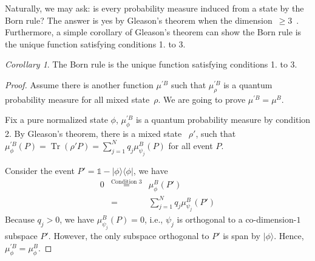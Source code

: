 \documentclass{article}
\theoremstyle{remark}
\newtheorem{cor}{Corollary}
\newcommand{\Hilb}{\mathcal{H}}
\newcommand{\ket}[1]{|#1\rangle}
\newcommand{\proj}[1]{|#1 \rangle\langle #1 |}
\newcommand{\Tr}{\mathop{\mathrm{Tr}}\nolimits}
\begin{document}
Naturally, we may ask: is every probability measure induced from a
state by the Born rule? The answer is yes by Gleason's theorem when
the dimension~$\ge3$~\cite{gleason1957,peres1995quantum,Redhead1987-REDINA}.
Furthermore, a simple corollary of Gleason's theorem can show the
Born rule is the unique function satisfying conditions 1. to 3.
\begin{cor}
The Born rule is the unique function satisfying conditions 1. to 3.
\end{cor}
\begin{proof}
Assume there is another function $\mu^{\prime B}$ such that $\mu^{\prime B}_{\rho}$
is a quantum probability measure for all mixed state~$\rho$. We
are going to prove $\mu^{\prime B}=\mu^B$.

Fix a pure normalized state $\phi$, $\mu^{\prime B}_{\phi}$ is a quantum
probability measure by condition 2. By Gleason's theorem, there is
a mixed state ~$\rho'$, such that $\mu^{\prime B}_{\phi}\left(P\right)=\Tr\left(\rho'P\right)=\sum_{j=1}^{N}q_{j}\mu^B_{\psi_{j}}\left(P\right)$
for all event $P$. 

Consider the event $P'=\mathbb{1}-\proj{\phi}$, we have 
\begin{eqnarray*}
0 & \overset{\textrm{Condition 3}}{=} & \mu^B_{\phi}\left(P'\right)\\
 & = & \sum_{j=1}^{N}q_{j}\mu^B_{\psi_{j}}\left(P'\right)
\end{eqnarray*}
Because $q_{j}>0$, we have $\mu^B_{\psi_{j}}\left(P\right)=0$,
i.e., $\psi_{j}$ is orthogonal to a co-dimension-$1$ subspace $P'$.
However, the only subspace orthogonal to $P'$ is span by $\ket{\phi}$.
Hence, $\mu^{\prime B}_{\phi}=\mu^B_{\phi}$.
\end{proof}




\end{document}
